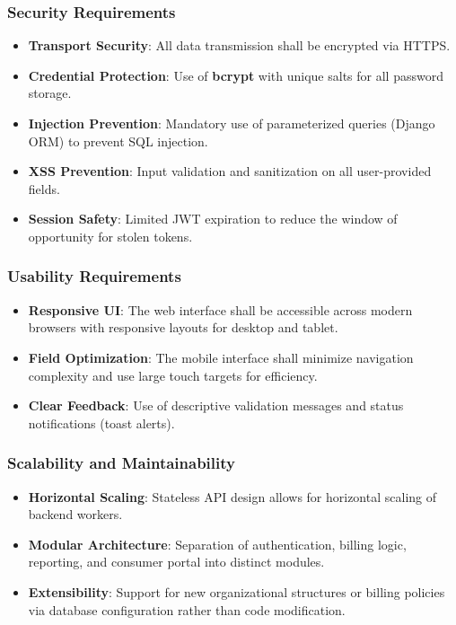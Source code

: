 \documentclass[12pt, a4paper, onecolumn]{report}
\begin{document}
\subsubsection{Security Requirements}
\begin{itemize}
    \item \textbf{Transport Security}: All data transmission shall be encrypted via HTTPS.
    \item \textbf{Credential Protection}: Use of \textbf{bcrypt} with unique salts for all password storage.
    \item \textbf{Injection Prevention}: Mandatory use of parameterized queries (Django ORM) to prevent SQL injection.
    \item \textbf{XSS Prevention}: Input validation and sanitization on all user-provided fields.
    \item \textbf{Session Safety}: Limited JWT expiration to reduce the window of opportunity for stolen tokens.
\end{itemize}

\subsubsection{Usability Requirements}
\begin{itemize}
    \item \textbf{Responsive UI}: The web interface shall be accessible across modern browsers with responsive layouts for desktop and tablet.
    \item \textbf{Field Optimization}: The mobile interface shall minimize navigation complexity and use large touch targets for efficiency.
    \item \textbf{Clear Feedback}: Use of descriptive validation messages and status notifications (toast alerts).
\end{itemize}

\subsubsection{Scalability and Maintainability}
\begin{itemize}
    \item \textbf{Horizontal Scaling}: Stateless API design allows for horizontal scaling of backend workers.
    \item \textbf{Modular Architecture}: Separation of authentication, billing logic, reporting, and consumer portal into distinct modules.
    \item \textbf{Extensibility}: Support for new organizational structures or billing policies via database configuration rather than code modification.
\end{itemize}
\end{document}
